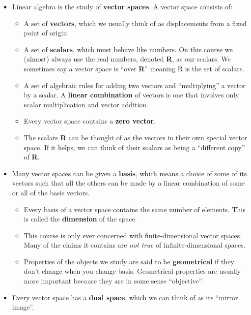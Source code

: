 \documentclass[oneside,english]{amsbook}
\numberwithin{section}{chapter}
\theoremstyle{plain}
\theoremstyle{definition}
\begin{document}
\begin{itemize}
	\item
	Linear algebra is the study of \textbf{vector spaces}. A vector space
	consists of:
	
	\begin{itemize}
		\item
		A set of \textbf{vectors}, which we usually think of as
		displacements from a fixed point of origin
		\item
		A set of \textbf{scalars}, which must behave like numbers. On this
		course we (almost) always use the real numbers, denoted \textbf{R},
		as our scalars. We sometimes say a vector space is ``over
		\textbf{R}'' meaning R is the set of scalars.
		\item
		A set of algebraic rules for adding two vectors and ``multiplying''
		a vector by a scalar. A \textbf{linear combination} of vectors is
		one that involves only scalar multiplication and vector addition.
		\item
		Every vector space contains a \textbf{zero vector}.
		\item
		The scalars \textbf{R} can be thought of as the vectors in their own
		special vector space. If it helps, we can think of their scalars as
		being a ``different copy'' of \textbf{R}.
	\end{itemize}
	\item
	Many vector spaces can be given a \textbf{basis}, which means a choice
	of some of its vectors such that all the others can be made by a
	linear combination of some or all of the basis vectors.
	
	\begin{itemize}
		\item
		Every basis of a vector space contains the same number of elements.
		This is called the \textbf{dimension} of the space.
		\item
		This course is only ever concerned with finite-dimensional vector
		spaces. Many of the claims it contains are \emph{not true} of
		infinite-dimensional spaces.
		\item
		Properties of the objects we study are said to be
		\textbf{geometrical} if they don't change when you change basis.
		Geometrical properties are usually more important because they are
		in some sense ``objective''.
	\end{itemize}
	\item
	Every vector space has a \textbf{dual space}, which we can think of as
	its ``mirror image''.
	

\end{itemize}
\end{document}
